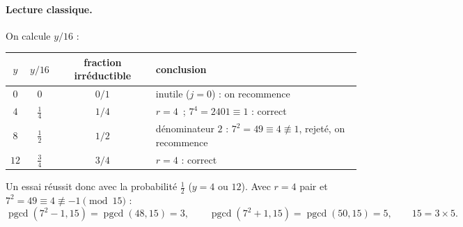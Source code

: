 \paragraph{Lecture classique.} On calcule $y/16$ :
\begin{center}
\renewcommand{\arraystretch}{1.2}
\begin{tabular}{@{}cccp{7.3cm}@{}}
\toprule
$y$ & $y/16$ & fraction irréductible & conclusion\\
\midrule
$0$ & $0$ & $0/1$ & inutile ($j=0$) : on recommence\\
$4$ & $\frac14$ & $1/4$ & $r=4$\ ; $7^4=2401\equiv1$ : correct\\
$8$ & $\frac12$ & $1/2$ & dénominateur $2$ : $7^2=49\equiv4\not\equiv1$, rejeté, on recommence\\
$12$ & $\frac34$ & $3/4$ & $r=4$ : correct\\
\bottomrule
\end{tabular}
\end{center}
Un essai réussit donc avec la probabilité $\frac12$ ($y=4$ ou $12$). Avec $r=4$ pair et $7^{2}=49\equiv4\not\equiv-1\pmod{15}$ :
\[
  \operatorname{pgcd}(7^2-1,15)=\operatorname{pgcd}(48,15)=3,\qquad
  \operatorname{pgcd}(7^2+1,15)=\operatorname{pgcd}(50,15)=5,\qquad 15=3\times5.
\]

